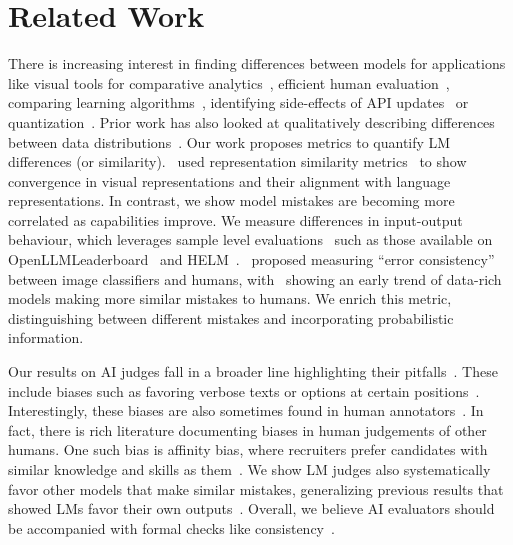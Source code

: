 
\section{Related Work}

There is increasing interest in finding differences between models for applications like visual tools for comparative analytics~\citep{strobelt-etal-2021-lmdiff, kahng2024llmcomparatorvisualanalytics}, efficient human evaluation~\citep{boubdir2023promptsmakedifferencedata}, comparing learning algorithms~\citep{shah2023modeldiff}, identifying side-effects of API updates~\citep{eyuboglu2024changelist} or quantization~\citep{dutta2024accuracy}. Prior work has also looked at qualitatively describing differences between data distributions~\citep{zhong2022describingdifferencestextdistributions, zhong2023goal, dunlap2024describingdifferencesimagesets, dunlap2024vibecheckdiscoverquantifyqualitative}. Our work proposes metrics to quantify LM differences (or similarity).~\citet{huh2024platonic} used representation similarity metrics~\citep{kornblith2019similarity, bansal2021revisiting} to show convergence in visual representations and their alignment with language representations. In contrast, we show model mistakes are becoming more correlated as capabilities improve. We measure differences in input-output behaviour, which leverages sample level evaluations~\citep{burnell2023reporting} such as those available on OpenLLMLeaderboard~\citep{myrzakhan2024openllmleaderboard} and HELM~\citep{bommasani2023holistic}.~\citet{geirhos2020beyond} proposed measuring ``error consistency'' between image classifiers and humans, with~\citet{geirhos2021partial} showing an early trend of data-rich models making more similar mistakes to humans. We enrich this metric, distinguishing between different mistakes and incorporating probabilistic information.

Our results on AI judges fall in a broader line highlighting their pitfalls~\citep{zheng2024cheating}. These include biases such as favoring verbose texts or options at certain positions~\citep{koo-etal-2024-benchmarking, ye2024justiceprejudicequantifyingbiases}. Interestingly, these biases are also sometimes found in human annotators~\citep{chen-etal-2024-humans}. In fact, there is rich literature documenting biases in human judgements of other humans. One such bias is affinity bias, where recruiters prefer candidates with similar knowledge and skills as them~\citep{bagues2012recruiters}. We show LM judges also systematically favor other models that make similar mistakes, generalizing previous results that showed LMs favor their own outputs~\citep{liu-etal-2024-llms-narcissistic, panickssery2024llm}. Overall, we believe AI evaluators should be accompanied with formal checks like consistency~\citep{fluri2024evaluating}.


